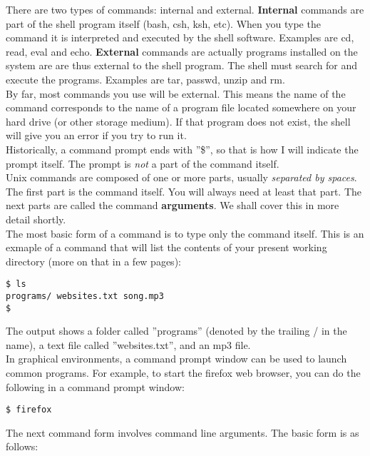 There are two types of commands: internal and external.  \textbf{Internal} commands are part of the shell program itself (bash, csh, ksh, etc).  When you type the command it is interpreted and executed by the shell software.  Examples are cd, read, eval and echo.  \textbf{External} commands are actually programs installed on the system are are thus external to the shell program.  The shell must search for and execute the programs.  Examples are tar, passwd, unzip and rm.\\

By far, most commands you use will be external.  This means the name of the command corresponds to the name of a program file located somewhere on your hard drive (or other storage medium).  If that program does not exist, the shell will give you an error if you try to run it.\\

Historically, a command prompt ends with ''\$'', so that is how I will indicate the prompt itself.  The prompt is \textit{not} a part of the command itself.\\

Unix commands are composed of one or more parts, usually \textit{separated by spaces}. The first part is the command itself.  You will always need at least that part.  The next parts are called the command \textbf{arguments}.  We shall cover this in more detail shortly.\\

The most basic form of a command is to type only the command itself.  This is an exmaple of a command that will list the contents of your present working directory (more on that in a few pages):

\begin{verbatim}
$ ls
programs/ websites.txt song.mp3
$
\end{verbatim}

The output shows a folder called ''programs'' (denoted by the trailing / in the name), a text file called ''websites.txt'', and an mp3 file.\\

In graphical environments, a command prompt window can be used to launch common programs.  For example, to start the firefox web browser, you can do the following in a command prompt window:

\begin{verbatim}
$ firefox
\end{verbatim}

The next command form involves command line arguments.  The basic form is as follows:

